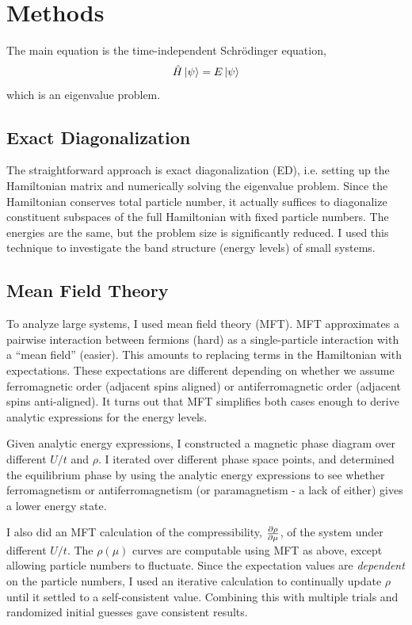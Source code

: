 \documentclass{article}
\newcommand{\parder}[3][1]{
	\ifnum1=#1\relax
		\frac{\partial #2}{\partial #3}
	\else
		\frac{\partial^#1 #2}{\partial #3^#1}
	\fi
}
\begin{document}
\section{Methods}
The main equation is the time-independent Schr\"odinger equation,
\begin{align*}
\hat H\Ket{\psi} = E\Ket{\psi}
\end{align*}
which is an eigenvalue problem.

\subsection{Exact Diagonalization} The straightforward approach is exact diagonalization (ED), i.e. setting up the Hamiltonian matrix and numerically solving the eigenvalue problem. Since the Hamiltonian conserves total particle number, it actually suffices to diagonalize constituent subspaces of the full Hamiltonian with fixed particle numbers. The energies are the same, but the problem size is significantly reduced. I used this technique to investigate the band structure (energy levels) of small systems.

\subsection{Mean Field Theory} To analyze large systems, I used mean field theory (MFT). MFT approximates a pairwise interaction between fermions (hard) as a single-particle interaction with a ``mean field'' (easier). This amounts to replacing terms in the Hamiltonian with expectations. These expectations are different depending on whether we assume ferromagnetic order (adjacent spins aligned) or antiferromagnetic order (adjacent spins anti-aligned). It turns out that MFT simplifies both cases enough to derive analytic expressions for the energy levels.

Given analytic energy expressions, I constructed a magnetic phase diagram over different $U/t$ and $\rho$. I iterated over different phase space points, and determined the equilibrium phase by using the analytic energy expressions to see whether ferromagnetism or antiferromagnetism (or paramagnetism - a lack of either) gives a lower energy state.

I also did an MFT calculation of the compressibility, $\parder{\rho}{\mu}$, of the system under different $U/t$. The $\rho(\mu)$ curves are computable using MFT as above, except allowing particle numbers to fluctuate. Since the expectation values are \textit{dependent} on the particle numbers, I used an iterative calculation to continually update $\rho$ until it settled to a self-consistent value. Combining this with multiple trials and randomized initial guesses gave consistent results.
\end{document}
